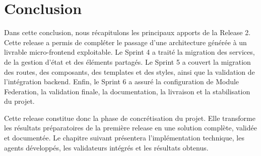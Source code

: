 \section*{Conclusion}

Dans cette conclusion, nous récapitulons les principaux apports de la Release 2. Cette release a permis de compléter le passage d'une architecture générée à un livrable micro-frontend exploitable. Le Sprint 4 a traité la migration des services, de la gestion d'état et des éléments partagés. Le Sprint 5 a couvert la migration des routes, des composants, des templates et des styles, ainsi que la validation de l'intégration backend. Enfin, le Sprint 6 a assuré la configuration de Module Federation, la validation finale, la documentation, la livraison et la stabilisation du projet.

Cette release constitue donc la phase de concrétisation du projet. Elle transforme les résultats préparatoires de la première release en une solution complète, validée et documentée. Le chapitre suivant présentera l'implémentation technique, les agents développés, les validateurs intégrés et les résultats obtenus.

